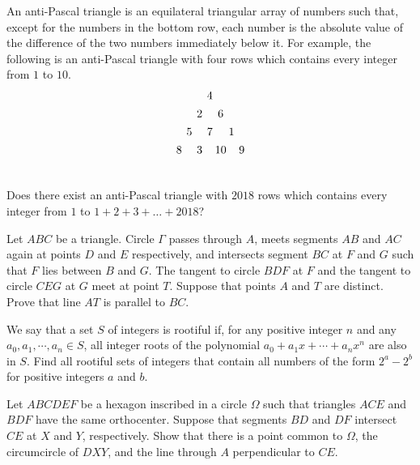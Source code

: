 \documentclass[11pt]{scrartcl}
\begin{document}
\begin{problem}[7494618588207758150]
	An anti-Pascal triangle is an equilateral triangular array of numbers such that, except for the numbers in the bottom row, each number is the absolute value of the difference of the two numbers immediately below it. For example, the following is an anti-Pascal triangle with four rows which contains every integer from $1$ to $10$.
\[\begin{array}{
c@{\hspace{4pt}}c@{\hspace{4pt}}
c@{\hspace{4pt}}c@{\hspace{2pt}}c@{\hspace{2pt}}c@{\hspace{4pt}}c
} \vspace{4pt}
 & & & 4 & & &  \\\vspace{4pt}
 & & 2 & & 6 & &  \\\vspace{4pt}
 & 5 & & 7 & & 1 & \\\vspace{4pt}
 8 & & 3 & & 10 & & 9 \\\vspace{4pt}
\end{array}\]Does there exist an anti-Pascal triangle with $2018$ rows which contains every integer from $1$ to $1 + 2 + 3 + \dots + 2018$?

\end{problem}
\begin{problem}[797215984506934]
	Let $ABC$ be a triangle. Circle $\Gamma$ passes through $A$, meets segments $AB$ and $AC$ again at points $D$ and $E$ respectively, and intersects segment $BC$ at $F$ and $G$ such that $F$ lies between $B$ and $G$. The tangent to circle $BDF$ at $F$ and the tangent to circle $CEG$ at $G$ meet at point $T$. Suppose that points $A$ and $T$ are distinct. Prove that line $AT$ is parallel to $BC$.
\end{problem}
\begin{problem}[4892352754475215646]
	We say that a set $S$ of integers is rootiful if, for any positive integer $n$ and any $a_0, a_1, \cdots, a_n \in S$, all integer roots of the polynomial $a_0+a_1x+\cdots+a_nx^n$ are also in $S$. Find all rootiful sets of integers that contain all numbers of the form $2^a - 2^b$ for positive integers $a$ and $b$.
\end{problem}
\begin{problem}[639126468624733]
Let $ABCDEF$ be a hexagon inscribed in a circle $\Omega$ such that triangles $ACE$ and $BDF$ have the same orthocenter. Suppose that segments $BD$ and $DF$ intersect $CE$ at $X$ and $Y$, respectively. Show that there is a point common to $\Omega$, the circumcircle of $DXY$, and the line through $A$ perpendicular to $CE$.
\end{problem}
\end{document}
